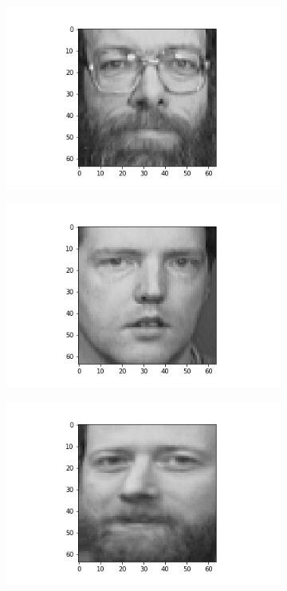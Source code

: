 \documentclass[12pt, a4paper]{article}
\begin{document}
\begin{figure}[h]
    \begin{subfigure}{0.3\linewidth}
        \centering
        \includegraphics[width=\linewidth]{images/q3/c/4/0.png}
    \end{subfigure}
    \hfill
    \begin{subfigure}{0.3\linewidth}
        \centering
        \includegraphics[width=\linewidth]{images/q3/c/4/1.png}
    \end{subfigure}
    \hfill
    \begin{subfigure}{0.3\linewidth}
        \centering
        \includegraphics[width=\linewidth]{images/q3/c/4/2.png}

\end{subfigure}
\end{figure}
\end{document}

